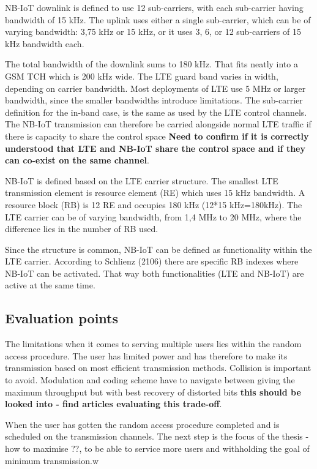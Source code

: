 \documentclass[10pt,a4paper,titlepage,twoside]{article}
\newcommand{\point}[1]{\textbf{\color{ymared} #1}}
\begin{document}
NB-IoT downlink is defined to use 12 sub-carriers, with each sub-carrier having bandwidth of 15 kHz. The uplink uses either a single sub-carrier, which can be of varying bandwidth: 3,75 kHz or 15 kHz, or it uses 3, 6, or 12 sub-carriers of 15 kHz bandwidth each\cite{3gpp}.

The total bandwidth of the downlink sums to 180 kHz. That fits neatly into a GSM TCH which is 200 kHz wide. The LTE guard band varies in width, depending on carrier bandwidth. Most deployments of LTE use 5 MHz or larger bandwidth, since the smaller bandwidths introduce limitations. The sub-carrier definition for the in-band case, is the same as used by the LTE control channels. The NB-IoT transmission can therefore be carried alongside normal LTE traffic if there is capacity to share the control space \point{Need to confirm if it is correctly understood that LTE and NB-IoT share the control space and if they can co-exist on the same channel}.

NB-IoT is defined based on the LTE carrier structure. The smallest LTE transmission element is resource element (RE) which uses 15 kHz bandwidth. A resource block (RB) is 12 RE and occupies 180 kHz (12*15 kHz=180kHz). The LTE carrier can be of varying bandwidth, from 1,4 MHz to 20 MHz, where the difference lies in the number of RB used.

Since the structure is common, NB-IoT can be defined as functionality within the LTE carrier. According to Schlienz (2106) \cite{schlienz} there are specific RB indexes where NB-IoT can be activated. That way both functionalities (LTE and NB-IoT) are active at the same time.



\subsection{Evaluation points}

The limitations when it comes to serving multiple users lies within the random access procedure. The user has limited power and has therefore to make its transmission based on most efficient transmission methods. Collision is important to avoid. Modulation and coding scheme have to navigate between giving the maximum throughput but with best recovery of distorted bits \point{this should be looked into - find articles evaluating this trade-off}.

When the user has gotten the random access procedure completed and is scheduled on the transmission channels. The next step is the focus of the thesis - how to maximise ??, to be able to service more users and withholding the goal of minimum transmission.w
\end{document}
